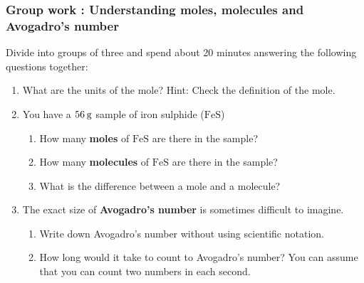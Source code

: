 \label{m38717*secfhsst!!!underscore!!!id832}
            \subsubsection{  Group work : Understanding moles, molecules and Avogadro's number
      }
            \nopagebreak
            
      \label{m38717*id279596}Divide into groups of three and spend about 20 minutes answering the following questions together:\par 
      \label{m38717*id279603}\begin{enumerate}[noitemsep, label=\textbf{\arabic*}. ] 
            \label{m38717*uid39}\item What are the units of the mole? Hint: Check the definition of the mole.
\label{m38717*uid40}\item You have a \begin{math}56\phantom{\rule{2pt}{0ex}}\mathrm{g}\end{math} sample of iron sulphide (\begin{math}\mathrm{FeS}\end{math})
\label{m38717*id279631}\begin{enumerate}[noitemsep, label=\textbf{\alph*}. ] 
            \label{m38717*uid41}\item How many \textbf{moles} of \begin{math}\mathrm{FeS}\end{math} are there in the sample?
\label{m38717*uid42}\item How many \textbf{molecules} of \begin{math}\mathrm{FeS}\end{math} are there in the sample?
\label{m38717*uid43}\item What is the difference between a mole and a molecule?
\end{enumerate}
        \label{m38717*uid44}\item The exact size of \textbf{Avogadro's number} is sometimes difficult to imagine.
\label{m38717*id279703}\begin{enumerate}[noitemsep, label=\textbf{\alph*}. ] 
            \label{m38717*uid45}\item Write down Avogadro's number without using scientific notation.
\label{m38717*uid46}\item How long would it take to count to Avogadro's number? You can assume that you can count two numbers in each second.
\end{enumerate}
        \end{enumerate}
        
